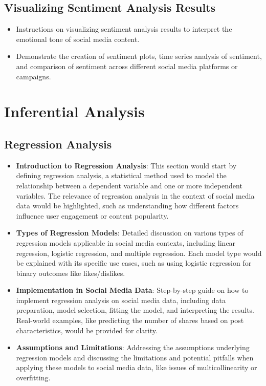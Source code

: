 \documentclass[
]{book}
\providecommand{\tightlist}{%
  \setlength{\itemsep}{0pt}\setlength{\parskip}{0pt}}
\begin{document}
\hypertarget{visualizing-sentiment-analysis-results}{%
\section{Visualizing Sentiment Analysis Results}\label{visualizing-sentiment-analysis-results}}

\begin{itemize}
\tightlist
\item
  Instructions on visualizing sentiment analysis results to interpret the emotional tone of social media content.
\item
  Demonstrate the creation of sentiment plots, time series analysis of sentiment, and comparison of sentiment across different social media platforms or campaigns.
\end{itemize}

\hypertarget{inferential-analysis}{%
\chapter{Inferential Analysis}\label{inferential-analysis}}

\hypertarget{regression-analysis}{%
\section*{Regression Analysis}\label{regression-analysis}}

\begin{itemize}
\tightlist
\item
  \textbf{Introduction to Regression Analysis}: This section would start by defining regression analysis, a statistical method used to model the relationship between a dependent variable and one or more independent variables. The relevance of regression analysis in the context of social media data would be highlighted, such as understanding how different factors influence user engagement or content popularity.
\item
  \textbf{Types of Regression Models}: Detailed discussion on various types of regression models applicable in social media contexts, including linear regression, logistic regression, and multiple regression. Each model type would be explained with its specific use cases, such as using logistic regression for binary outcomes like likes/dislikes.
\item
  \textbf{Implementation in Social Media Data}: Step-by-step guide on how to implement regression analysis on social media data, including data preparation, model selection, fitting the model, and interpreting the results. Real-world examples, like predicting the number of shares based on post characteristics, would be provided for clarity.
\item
  \textbf{Assumptions and Limitations}: Addressing the assumptions underlying regression models and discussing the limitations and potential pitfalls when applying these models to social media data, like issues of multicollinearity or overfitting.
\end{itemize}
\end{document}
